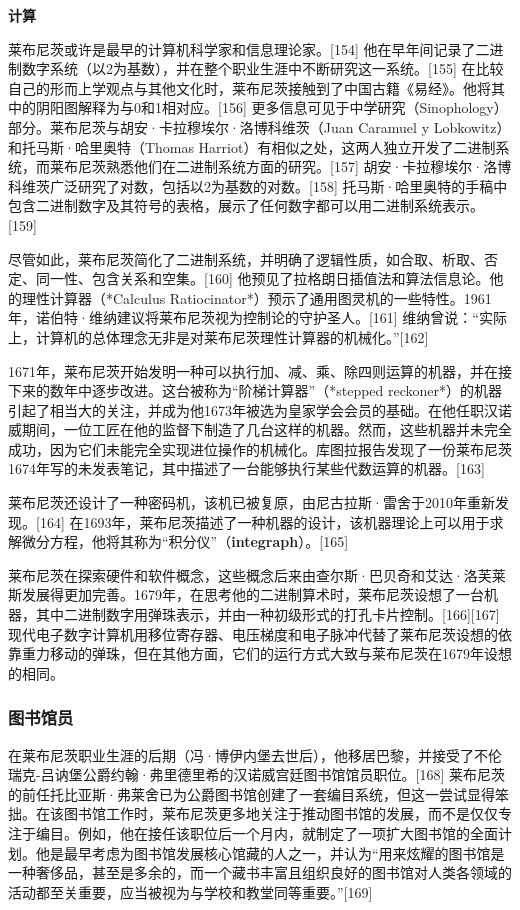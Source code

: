 \textbf{计算}

莱布尼茨或许是最早的计算机科学家和信息理论家。[154] 他在早年间记录了二进制数字系统（以2为基数），并在整个职业生涯中不断研究这一系统。[155] 在比较自己的形而上学观点与其他文化时，莱布尼茨接触到了中国古籍《易经》。他将其中的阴阳图解释为与0和1相对应。[156] 更多信息可见于中学研究（Sinophology）部分。莱布尼茨与胡安·卡拉穆埃尔·洛博科维茨（Juan Caramuel y Lobkowitz）和托马斯·哈里奥特（Thomas Harriot）有相似之处，这两人独立开发了二进制系统，而莱布尼茨熟悉他们在二进制系统方面的研究。[157] 胡安·卡拉穆埃尔·洛博科维茨广泛研究了对数，包括以2为基数的对数。[158] 托马斯·哈里奥特的手稿中包含二进制数字及其符号的表格，展示了任何数字都可以用二进制系统表示。[159]  

尽管如此，莱布尼茨简化了二进制系统，并明确了逻辑性质，如合取、析取、否定、同一性、包含关系和空集。[160] 他预见了拉格朗日插值法和算法信息论。他的理性计算器（*Calculus Ratiocinator*）预示了通用图灵机的一些特性。1961年，诺伯特·维纳建议将莱布尼茨视为控制论的守护圣人。[161] 维纳曾说：“实际上，计算机的总体理念无非是对莱布尼茨理性计算器的机械化。”[162]

1671年，莱布尼茨开始发明一种可以执行加、减、乘、除四则运算的机器，并在接下来的数年中逐步改进。这台被称为“阶梯计算器”（*stepped reckoner*）的机器引起了相当大的关注，并成为他1673年被选为皇家学会会员的基础。在他任职汉诺威期间，一位工匠在他的监督下制造了几台这样的机器。然而，这些机器并未完全成功，因为它们未能完全实现进位操作的机械化。库图拉报告发现了一份莱布尼茨1674年写的未发表笔记，其中描述了一台能够执行某些代数运算的机器。[163]  

莱布尼茨还设计了一种密码机，该机已被复原，由尼古拉斯·雷舍于2010年重新发现。[164] 在1693年，莱布尼茨描述了一种机器的设计，该机器理论上可以用于求解微分方程，他将其称为“积分仪”（\textbf{integraph}）。[165]

莱布尼茨在探索硬件和软件概念，这些概念后来由查尔斯·巴贝奇和艾达·洛芙莱斯发展得更加完善。1679年，在思考他的二进制算术时，莱布尼茨设想了一台机器，其中二进制数字用弹珠表示，并由一种初级形式的打孔卡片控制。[166][167] 现代电子数字计算机用移位寄存器、电压梯度和电子脉冲代替了莱布尼茨设想的依靠重力移动的弹珠，但在其他方面，它们的运行方式大致与莱布尼茨在1679年设想的相同。
\subsubsection{图书馆员}
在莱布尼茨职业生涯的后期（冯·博伊内堡去世后），他移居巴黎，并接受了不伦瑞克-吕讷堡公爵约翰·弗里德里希的汉诺威宫廷图书馆馆员职位。[168] 莱布尼茨的前任托比亚斯·弗莱舍已为公爵图书馆创建了一套编目系统，但这一尝试显得笨拙。在该图书馆工作时，莱布尼茨更多地关注于推动图书馆的发展，而不是仅仅专注于编目。例如，他在接任该职位后一个月内，就制定了一项扩大图书馆的全面计划。他是最早考虑为图书馆发展核心馆藏的人之一，并认为“用来炫耀的图书馆是一种奢侈品，甚至是多余的，而一个藏书丰富且组织良好的图书馆对人类各领域的活动都至关重要，应当被视为与学校和教堂同等重要。”[169]  

